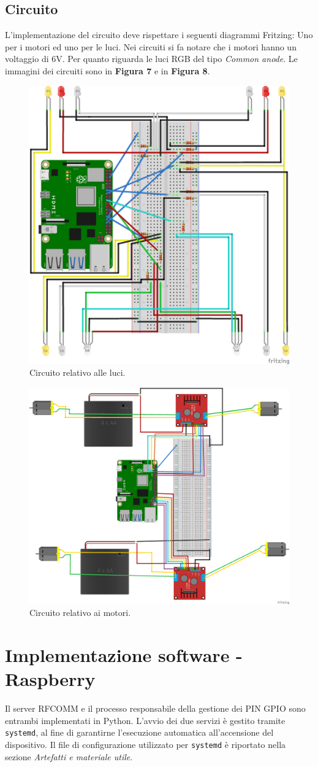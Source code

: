 \documentclass{article}
\begin{document}
\subsection{Circuito}
L'implementazione del circuito deve rispettare i seguenti diagrammi Fritzing: Uno per i motori ed uno per le luci.
\newline
Nei circuiti si fa notare che i motori hanno un voltaggio di 6V. Per quanto riguarda le luci RGB del tipo \textit{Common anode}.
Le immagini dei circuiti sono in \textbf{Figura 7} e in \textbf{Figura 8}.
\begin{figure}
    \centering
    \includegraphics[width=0.5\linewidth]{imgs/luci.png}
    \caption{Circuito relativo alle luci.}
    \label{fig:enter-label}
\end{figure}
\begin{figure}
    \centering
    \includegraphics[width=0.5\linewidth]{imgs/motori_batterie.png}
    \caption{Circuito relativo ai motori.}
    \label{fig:enter-label}
\end{figure}
\section{Implementazione software - Raspberry}
Il server RFCOMM e il processo responsabile della gestione dei PIN GPIO sono entrambi implementati in Python. L'avvio dei due servizi è gestito tramite \texttt{systemd}, al fine di garantirne l'esecuzione automatica all'accensione del dispositivo. Il file di configurazione utilizzato per \texttt{systemd} è riportato nella sezione \textit{Artefatti e materiale utile}.
\end{document}
